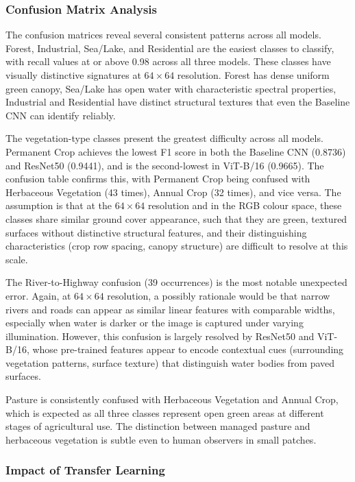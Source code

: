 \documentclass[12pt, letterpaper]{article}
\begin{document}
\subsubsection{Confusion Matrix Analysis}

The confusion matrices reveal several consistent patterns across all models. Forest, Industrial, Sea/Lake, and Residential are the easiest classes to classify, with recall values at or above 0.98 across all three models. These classes have visually distinctive signatures at $64 \times 64$ resolution. Forest has dense uniform green canopy, Sea/Lake has open water with characteristic spectral properties, Industrial and Residential have distinct structural textures that even the Baseline CNN can identify reliably.

The vegetation-type classes present the greatest difficulty across all models.
Permanent Crop achieves the lowest F1 score in both the Baseline CNN (0.8736) and ResNet50 (0.9441), and is the second-lowest in ViT-B/16 (0.9665). The confusion table confirms this, with Permanent Crop being confused with Herbaceous Vegetation (43 times), Annual Crop (32 times), and vice versa. The assumption is that at the $64 \times 64$ resolution and in the RGB colour space, these classes share similar ground cover appearance, such that they are green, textured surfaces without distinctive structural features, and their distinguishing characteristics (crop row spacing, canopy structure) are difficult to resolve at this scale.

The River-to-Highway confusion (39 occurrences) is the most notable unexpected error.
Again, at $64 \times 64$ resolution, a possibly rationale would be that narrow rivers and roads can appear as similar linear features with comparable widths, especially when water is darker or the image is captured under varying illumination. However, this confusion is largely resolved by ResNet50 and ViT-B/16, whose pre-trained features appear to encode contextual cues (surrounding vegetation patterns, surface texture) that distinguish water bodies from paved surfaces.

Pasture is consistently confused with Herbaceous Vegetation and Annual Crop, which is expected as all three classes represent open green areas at different stages of agricultural use. The distinction between managed pasture and herbaceous vegetation is subtle even to human observers in small patches.

\subsubsection{Impact of Transfer Learning}
\end{document}
